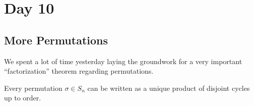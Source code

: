 \section{Day 10}

\subsection{More Permutations}
We spent a lot of time yesterday laying the groundwork for a very
important ``factorization'' theorem regarding permutations.

\begin{thm}
Every permutation $\sigma \in S_n$ can be written as a unique product of
disjoint cycles up to order.
\end{thm}
